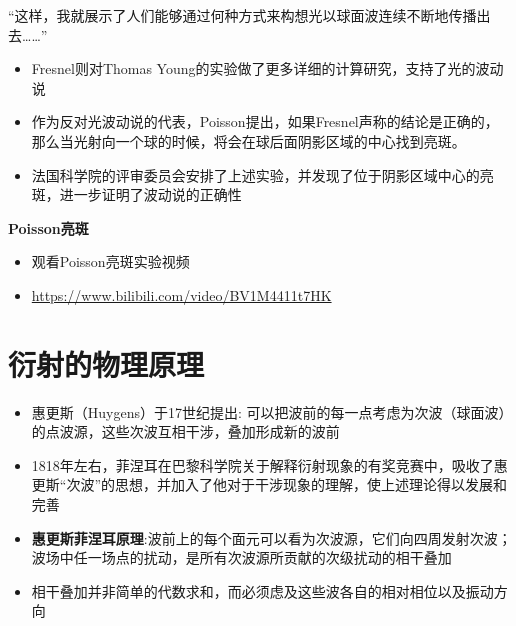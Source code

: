 \documentclass{beamer}
\newenvironment{slide}{
    \begin{frame}{\bfseries{\sectiontitle}}
}{
    \end{frame}
}
\let\sectiononly\section
\renewcommand{\section}[1]{
    \sectiononly{#1}
    \let\sectiontitle\relax
    \newcommand{\sectiontitle}{#1}
}
\begin{document}
\begin{slide}
    \begin{shaded}
        {\kaishu “这样，我就展示了人们能够通过何种方式来构想光以球面波连续不断地传播出去……”\\
        }
    \end{shaded}
    \begin{itemize}
        \item Fresnel则对Thomas Young的实验做了更多详细的计算研究，支持了光的波动说
        \item 作为反对光波动说的代表，Poisson提出，如果Fresnel声称的结论是正确的，那么当光射向一个球的时候，将会在球后面阴影区域的中心找到亮斑。
        \item 法国科学院的评审委员会安排了上述实验，并发现了位于阴影区域中心的亮斑，进一步证明了波动说的正确性
    \end{itemize}
\end{slide}

\begin{slide}
    \textbf{Poisson亮斑}
    \begin{itemize}
        \item 观看Poisson亮斑实验视频
        \item \url{https://www.bilibili.com/video/BV1M4411t7HK}
    \end{itemize}
\end{slide}

\section{衍射的物理原理}

\begin{slide}
    \begin{itemize}
        \item 惠更斯（Huygens）于17世纪提出: 可以把波前的每一点考虑为次波（球面波）的点波源，这些次波互相干涉，叠加形成新的波前
        \item 1818年左右，菲涅耳在巴黎科学院关于解释衍射现象的有奖竞赛中，吸收了惠更斯“次波”的思想，并加入了他对于干涉现象的理解，使上述理论得以发展和完善
        \item \textbf{惠更斯菲涅耳原理}:波前上的每个面元可以看为次波源，它们向四周发射次波；波场中任一场点的扰动，是所有次波源所贡献的次级扰动的相干叠加
        \item 相干叠加并非简单的代数求和，而必须虑及这些波各自的相对相位以及振动方向
    \end{itemize}
\end{slide}
\end{document}
